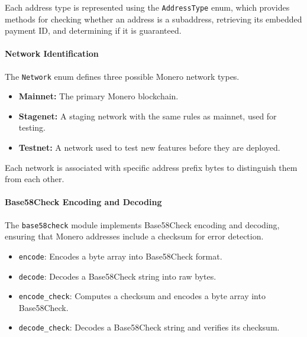 Each address type is represented using the \texttt{AddressType} enum, which provides methods for checking whether an address is a subaddress, retrieving its embedded payment ID, and determining if it is guaranteed. %

\paragraph{Network Identification}

The \texttt{Network} enum defines three possible Monero network types.  

\begin{itemize}
    \item \textbf{Mainnet:} The primary Monero blockchain.  
    \item \textbf{Stagenet:} A staging network with the same rules as mainnet, used for testing.  
    \item \textbf{Testnet:} A network used to test new features before they are deployed.  
\end{itemize}

Each network is associated with specific address prefix bytes to distinguish them from each other. %

\paragraph{Base58Check Encoding and Decoding}

The \texttt{base58check} module implements Base58Check encoding and decoding, ensuring that Monero addresses include a checksum for error detection. %

\begin{itemize}
    \item \texttt{encode}: Encodes a byte array into Base58Check format.  
    \item \texttt{decode}: Decodes a Base58Check string into raw bytes.  
    \item \texttt{encode\_check}: Computes a checksum and encodes a byte array into Base58Check.  
    \item \texttt{decode\_check}: Decodes a Base58Check string and verifies its checksum.  
\end{itemize}


